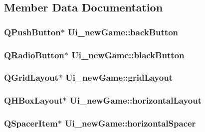 \subsection{Member Data Documentation}
\hypertarget{classUi__newGame_aa1b7c795fc8671d7312b83f73f84c371}{
\subsubsection[{back\-Button}]{\setlength{\rightskip}{0pt plus 5cm}Q\-Push\-Button$\ast$ Ui\-\_\-new\-Game\-::back\-Button}}\label{classUi__newGame_aa1b7c795fc8671d7312b83f73f84c371}
\hypertarget{classUi__newGame_aacee1777de6ba2eca962668346f66380}{
\subsubsection[{black\-Button}]{\setlength{\rightskip}{0pt plus 5cm}Q\-Radio\-Button$\ast$ Ui\-\_\-new\-Game\-::black\-Button}}\label{classUi__newGame_aacee1777de6ba2eca962668346f66380}
\hypertarget{classUi__newGame_af00c7fbe40d246c0a12423ff6639ce98}{
\subsubsection[{grid\-Layout}]{\setlength{\rightskip}{0pt plus 5cm}Q\-Grid\-Layout$\ast$ Ui\-\_\-new\-Game\-::grid\-Layout}}\label{classUi__newGame_af00c7fbe40d246c0a12423ff6639ce98}
\hypertarget{classUi__newGame_a6be218dc85507a03922230cf7571ce67}{
\subsubsection[{horizontal\-Layout}]{\setlength{\rightskip}{0pt plus 5cm}Q\-H\-Box\-Layout$\ast$ Ui\-\_\-new\-Game\-::horizontal\-Layout}}\label{classUi__newGame_a6be218dc85507a03922230cf7571ce67}
\hypertarget{classUi__newGame_ae7dea93fd489e1f7e266a4a68175e8e2}{
\subsubsection[{horizontal\-Spacer}]{\setlength{\rightskip}{0pt plus 5cm}Q\-Spacer\-Item$\ast$ Ui\-\_\-new\-Game\-::horizontal\-Spacer}}\label{classUi__newGame_ae7dea93fd489e1f7e266a4a68175e8e2}
